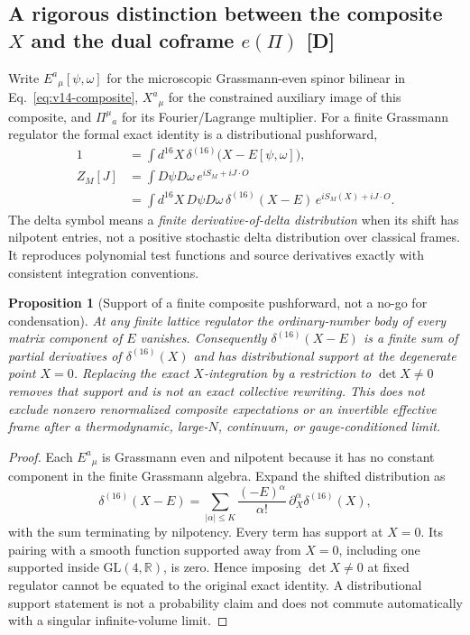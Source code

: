 \documentclass[11pt,a4paper]{article}
\newtheorem{proposition}{Proposition}[section]\newtheorem{lemma}[proposition]{Lemma}\newtheorem{definition}[proposition]{Definition}\newtheorem{remark}[proposition]{Remark}
\begin{document}
\subsection{A rigorous distinction between the composite $X$ and the dual coframe $e(\Pi)$ [D]}
\label{sec:v15-twofields}
Write $E^a{}_{\mu}[\psi,\omega]$ for the microscopic Grassmann-even spinor bilinear in Eq.~\eqref{eq:v14-composite}, $X^a{}_{\mu}$ for the constrained auxiliary image of this composite, and $\Pi^\mu{}_a$ for its Fourier/Lagrange multiplier. For a finite Grassmann regulator the formal exact identity is a distributional pushforward,
\begin{equation}\label{eq:v15-pushforward}
\begin{aligned}
1&=\int d^{16}X\,\delta^{(16)}\!\bigl(X-E[\psi,\omega]\bigr),\\
Z_M[J]&=\int D\psi D\omega\,e^{iS_M+iJ\cdot O}\\
&=\int d^{16}X\,D\psi D\omega\,
\delta^{(16)}(X-E)\,e^{iS_M(X)+iJ\cdot O}.
\end{aligned}
\end{equation}
The delta symbol means a \emph{finite derivative-of-delta distribution} when its shift has nilpotent entries, not a positive stochastic delta distribution over classical frames. It reproduces polynomial test functions and source derivatives exactly with consistent integration conventions.

\begin{proposition}[Support of a finite composite pushforward, not a no-go for condensation]\label{prop:v15-support}
At any finite lattice regulator the ordinary-number body of every matrix component of $E$ vanishes. Consequently $\delta^{(16)}(X-E)$ is a finite sum of partial derivatives of $\delta^{(16)}(X)$ and has distributional support at the degenerate point $X=0$. Replacing the \emph{exact} $X$-integration by a restriction to $\det X\ne0$ removes that support and is not an exact collective rewriting. This does not exclude nonzero renormalized composite expectations or an invertible \emph{effective} frame after a thermodynamic, large-$N$, continuum, or gauge-conditioned limit.
\end{proposition}
\begin{proof} Each $E^a{}_{\mu}$ is Grassmann even and nilpotent because it has no constant component in the finite Grassmann algebra. Expand the shifted distribution as
\[
\delta^{(16)}(X-E)=\sum_{|\alpha|\le K}\frac{(-E)^\alpha}{\alpha!}\,\partial_X^\alpha\delta^{(16)}(X),
\]
with the sum terminating by nilpotency. Every term has support at $X=0$. Its pairing with a smooth function supported away from $X=0$, including one supported inside $\mathrm{GL}(4,\mathbb R)$, is zero. Hence imposing $\det X\ne0$ at fixed regulator cannot be equated to the original exact identity. A distributional support statement is not a probability claim and does not commute automatically with a singular infinite-volume limit.\end{proof}
\end{document}
